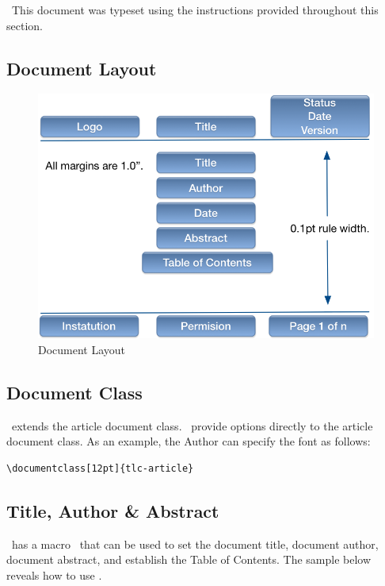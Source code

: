 \documentclass[12pt]{tlc-article}
\begin{document}
\tlcVspace

\tlcNote\ This document was typeset using the instructions provided throughout
this section.

\subsection{Document Layout}
\begin{figure}[h]
  \centering
  \includegraphics{images/titlepage.png}
  \caption{Document Layout}
  \label{fig:layout}
\end{figure}


\subsection{Document Class \tlcA}
\tlcA\ extends the article document class.  \tlcA\ provide options directly to
the article document class.  As an example, the Author can specify the font as
follows:

\begin{lstlisting}[basicstyle=\tiny]
  \documentclass[12pt]{tlc-article}
\end{lstlisting}


\subsection{Title, Author \& Abstract} \label{sec:TAA}
\tlcA\ has a macro \tlcTOC\ that can be used to set the document title, document
author, document abstract, and establish the Table of Contents.  The sample
below reveals how to use \tlcTOC.
\end{document}
